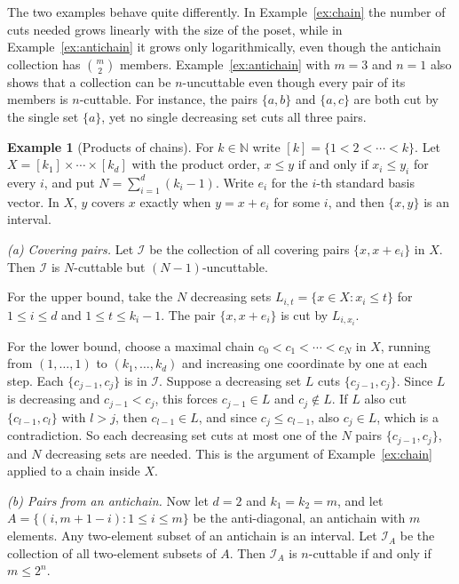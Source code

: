 \documentclass[10pt, a4paper]{article}
\theoremstyle{plain}
\theoremstyle{definition}
\newtheorem{example}[theorem]{Example}
\newcommand{\I}{\mathcal{I}}
\newcommand{\NN}{\mathbb{N}}
\begin{document}
The two examples behave quite differently. In Example~\ref{ex:chain} the number of
cuts needed grows linearly with the size of the poset, while in
Example~\ref{ex:antichain} it grows only logarithmically, even though the antichain
collection has $\binom{m}{2}$ members. Example~\ref{ex:antichain} with $m=3$ and
$n=1$ also shows that a collection can be $n$-uncuttable even though every pair of its
members is $n$-cuttable. For instance, the pairs $\{a,b\}$ and $\{a,c\}$ are both cut
by the single set $\{a\}$, yet no single decreasing set cuts all three pairs.

\begin{example}[Products of chains]\label{ex:product}
  For $k\in\NN$ write $[k]=\{1<2<\cdots<k\}$. Let $X=[k_1]\times\cdots\times[k_d]$
  with the product order, $x\le y$ if and only if $x_i\le y_i$ for every $i$, and put
  $N=\sum_{i=1}^d (k_i-1)$. Write $e_i$ for the $i$-th standard basis vector. In $X$,
  $y$ covers $x$ exactly when $y=x+e_i$ for some $i$, and then $\{x,y\}$ is an interval.

  \emph{(a) Covering pairs.} Let $\I$ be the collection of all covering pairs
  $\{x,x+e_i\}$ in $X$. Then $\I$ is $N$-cuttable but $(N-1)$-uncuttable.

  For the upper bound, take the $N$ decreasing sets
  $L_{i,t}=\{x\in X : x_i\le t\}$ for $1\le i\le d$ and $1\le t\le k_i-1$. The pair
  $\{x,x+e_i\}$ is cut by $L_{i,x_i}$.

  For the lower bound, choose a maximal chain $c_0<c_1<\cdots<c_N$ in $X$, running from
  $(1,\ldots,1)$ to $(k_1,\ldots,k_d)$ and increasing one coordinate by one at each
  step. Each $\{c_{j-1},c_j\}$ is in $\I$. Suppose a decreasing set $L$ cuts
  $\{c_{j-1},c_j\}$. Since $L$ is decreasing and $c_{j-1}<c_j$, this forces
  $c_{j-1}\in L$ and $c_j\notin L$. If $L$ also cut $\{c_{l-1},c_l\}$ with $l>j$, then
  $c_{l-1}\in L$, and since $c_j\le c_{l-1}$, also $c_j\in L$, which is a contradiction.
  So each decreasing set cuts at most one of the $N$ pairs $\{c_{j-1},c_j\}$, and $N$
  decreasing sets are needed. This is the argument of Example~\ref{ex:chain} applied
  to a chain inside $X$.

  \emph{(b) Pairs from an antichain.} Now let $d=2$ and $k_1=k_2=m$, and let
  $A=\{(i,m+1-i) : 1\le i\le m\}$ be the anti-diagonal, an antichain with $m$
  elements. Any two-element subset of an antichain is an interval. Let $\I_A$ be the
  collection of all two-element subsets of $A$. Then $\I_A$ is $n$-cuttable if and
  only if $m\le 2^n$.


\end{example}
\end{document}
